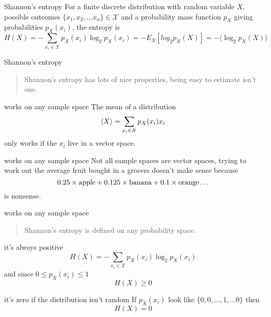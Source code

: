 \documentclass{beamer}
\newcommand{\crish}{\color{reddish}}
\newcommand{\cbla}{\color{black}}
\newcommand{\cblu}{\color{blue}}
\newcommand{\sm}{\color{reddish}$}
\newcommand{\fm}{$\color{black}{}}
\begin{document}
\begin{frame}{Shannon's entropy}
  For a finite discrete distribution with random variable \sm X\fm,
  possible outcomes \sm\{x_1,x_2,\ldots x_n\}\in\mathcal{X}\fm{} and a
  probability mass function \sm p_X\fm{} giving probabilities \sm p_X(x_i)\fm, the
  entropy is
\crish
  $$
H(X)=-\sum_{x_i\in \mathcal{X}}{p_X(x_i)\log_2p_X(x_i)}=-E_X[log_2{p_X(X)}]=-\langle \log_2{p_X(X)}\rangle
  $$
\cbla
\end{frame}

\begin{frame}{Shannon's entropy}
  \begin{quote}
    Shannon's entropy has lots of nice properties, being easy to estimate isn't one.
  \end{quote}
\end{frame}

\begin{frame}{works on any sample space}
The mean of a distribution
\crish
$$
\langle X\rangle = \sum_{x_i\in \mathcal{X}}{p_X(x_i)\cblu{}x_i\crish{}}
$$
\cbla
only works if the \cblu $x_i$\cbla{} live in a vector space. 
  \end{frame}


\begin{frame}{works on any sample space}
Not all sample spaces are vector spaces, trying to work out the average fruit bought in a grocers doesn't make sense because
\crish
$$
0.25\times \mbox{\color{green}apple\crish}+0.125\times \mbox{\color{yellow}banana\crish}+0.1\times \mbox{\color{orange}orange\crish}\ldots
$$ \cbla is nonsense.
  \end{frame}


\begin{frame}{works on any sample space}
  \begin{quote}
    Shannon's entropy is defined on any probability space.
    \end{quote}
  
  \end{frame}


\begin{frame}{it's always positive}
\crish
  $$
H(X)=-\sum_{x_i\in \mathcal{X}}{p_X(x_i)\log_2p_X(x_i)}
$$
\cbla
 and since \sm 0\le p_X(x_i)\le 1 \fm 
 \crish
 $$
 H(X)\ge 0
 $$
 \cbla
\end{frame}

\begin{frame}{it's zero if the distribution isn't random}
  If \sm p_X(x_i)\fm{} look like \sm\{0,0,\dots,1,\ldots 0\}\fm{} then
\crish
 $$
 H(X)= 0
 $$
 \cbla
\end{frame}
\end{document}
